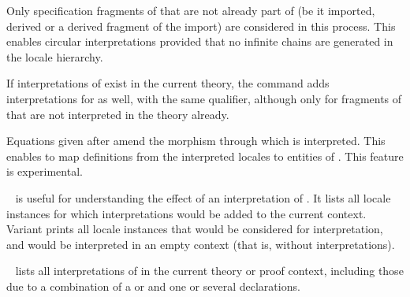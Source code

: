 \begin{isabellebody}
\begin{isamarkuptext}
\begin{description}
  Only specification fragments of  that are not already
  part of  (be it imported, derived or a derived fragment
  of the import) are considered in this process.  This enables
  circular interpretations provided that no infinite chains are
  generated in the locale hierarchy.

  If interpretations of  exist in the current theory, the
  command adds interpretations for  as well, with the same
  qualifier, although only for fragments of  that are not
  interpreted in the theory already.

  Equations given after \hyperlink{keyword.where}{\mbox{}} amend the morphism through
  which  is interpreted.  This enables to map definitions
  from the interpreted locales to entities of .  This
  feature is experimental.

  \item \hyperlink{command.print-dependencies}{\mbox{}}~ is useful for
  understanding the effect of an interpretation of .  It
  lists all locale instances for which interpretations would be added
  to the current context.  Variant \hyperlink{command.print-dependencies}{\mbox{}} prints all locale instances that
  would be considered for interpretation, and would be interpreted in
  an empty context (that is, without interpretations).

  \item \hyperlink{command.print-interps}{\mbox{}}~ lists all
  interpretations of  in the current theory or proof
  context, including those due to a combination of a \hyperlink{command.interpretation}{\mbox{}} or \hyperlink{command.interpret}{\mbox{}} and one or several
  \hyperlink{command.sublocale}{\mbox{}} declarations.


\end{description}
\end{isamarkuptext}
\end{isabellebody}
